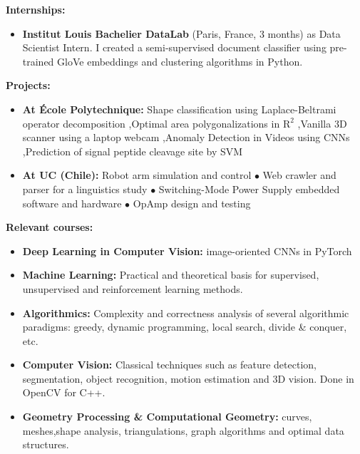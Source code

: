 
{\large \textbf{Internships:}}
\begin{itemize}

    \item \textbf{Institut Louis Bachelier DataLab} (Paris, France, 3 months) as Data Scientist Intern. I created a semi-supervised document classifier using pre-trained GloVe embeddings and clustering algorithms in Python.
\end{itemize}

{\large \textbf{Projects:}}



\begin{itemize}
    \item \textbf{At École Polytechnique:}
    Shape classification using Laplace-Beltrami operator decomposition \sep Optimal area polygonalizations in $\mathrm R^2$ \sep Vanilla 3D scanner using a laptop webcam \sep Anomaly Detection in Videos using CNNs \sep Prediction of signal peptide cleavage site by SVM
    
    \item \textbf{At UC (Chile):}
    Robot arm simulation and control $\bullet$ Web crawler and parser for a linguistics study $\bullet$ Switching-Mode Power Supply embedded software and hardware $\bullet$ OpAmp design and testing
\end{itemize}

{\large \textbf{Relevant courses:}}
\vspace{-1em}
\begin{multicols}{2}
\begin{itemize}
    \item \textbf{Deep Learning in Computer Vision:} image-oriented CNNs in PyTorch
    \item \textbf{Machine Learning:} Practical and theoretical basis for supervised, unsupervised and reinforcement learning methods. 
    \item \textbf{Algorithmics:} Complexity and correctness analysis of several algorithmic paradigms: greedy, dynamic programming, local search, divide \& conquer, etc.
    \columnbreak
    \item \textbf{Computer Vision:} Classical techniques such as feature detection, segmentation, object recognition, motion estimation and 3D vision. Done in OpenCV for C++.
    \item \textbf{Geometry Processing \& Computational Geometry:} curves, meshes,shape analysis, triangulations, graph algorithms and optimal data structures.
\end{itemize}
\end{multicols}
\vspace{-1.5em}